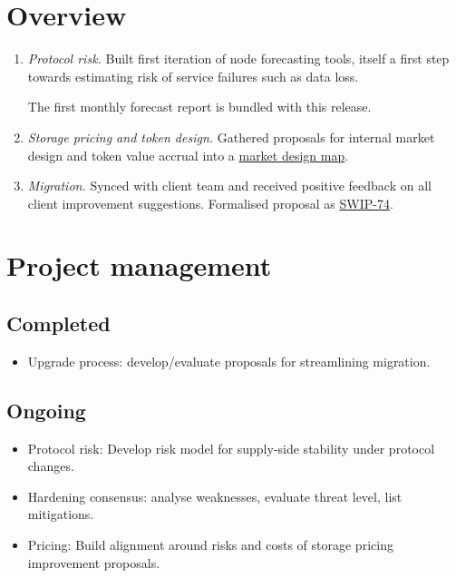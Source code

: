 \maketitle
\section*{Overview}

\begin{enumerate}
  \item \emph{Protocol risk.} Built first iteration of node forecasting tools, itself a first step towards estimating risk of service failures such as data loss.

  The first monthly forecast report is bundled with this release.

  \item \emph{Storage pricing and token design.} Gathered proposals for internal market design and token value accrual into a \href{https://claude.ai/artifact/7zcn4MBQzTQmZAYa4J5amg}{market design map}.
  \item \emph{Migration.} Synced with client team and received positive feedback on all client improvement suggestions. Formalised proposal as \href{https://github.com/awmacpherson/SWIPs/blob/SWIP-74/SWIPs/SWIP-74.md}{SWIP-74}.
\end{enumerate}

\section*{Project management}

\subsection*{Completed}

\begin{itemize}
  \item Upgrade process: develop/evaluate proposals for streamlining migration.
\end{itemize}

\subsection*{Ongoing}

\begin{itemize}
  \item Protocol risk: Develop risk model for supply-side stability under protocol changes.
  \item Hardening consensus: analyse weaknesses, evaluate threat level, list mitigations.
  \item Pricing: Build alignment around risks and costs of storage pricing improvement proposals. 
\end{itemize}


